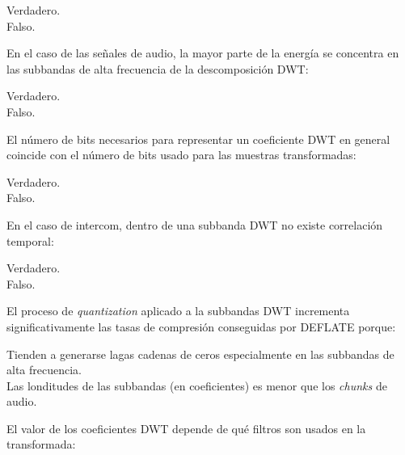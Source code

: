 \documentclass[legalpaper, 12pt, addpoints]{exam}
\begin{document}
\begin{questions}
\begin{oneparchoices}
  \choice Verdadero.\\
  \choice Falso.
\end{oneparchoices}
  
\vspace{0.10in}

\question En el caso de las señales de audio, la mayor parte de la
energía se concentra en las subbandas de alta frecuencia de la
descomposición DWT:

\begin{oneparchoices}
  \choice Verdadero.\\
  \choice Falso.
\end{oneparchoices}
  
\vspace{0.10in}

\question El número de bits necesarios para representar un coeficiente
DWT en general coincide con el número de bits usado para las muestras
transformadas:

\begin{oneparchoices}
  \choice Verdadero.\\
  \choice Falso.
\end{oneparchoices}
  
\vspace{0.10in}

\question En el caso de intercom, dentro de una subbanda DWT no existe correlación temporal:

\begin{oneparchoices}
  \choice Verdadero.\\
  \choice Falso.
\end{oneparchoices}
  
\vspace{0.10in}

\question El proceso de \emph{quantization} aplicado a la subbandas DWT
incrementa significativamente las tasas de compresión conseguidas por
DEFLATE porque:

\begin{oneparchoices}
  \choice Tienden a generarse lagas cadenas de ceros especialmente en las subbandas de alta frecuencia.\\
  \choice Las londitudes de las subbandas (en coeficientes) es menor que los \emph{chunks} de audio.
\end{oneparchoices}
  
\vspace{0.10in}

\question El valor de los coeficientes DWT depende de qué filtros son usados en la transformada:


\end{questions}
\end{document}
